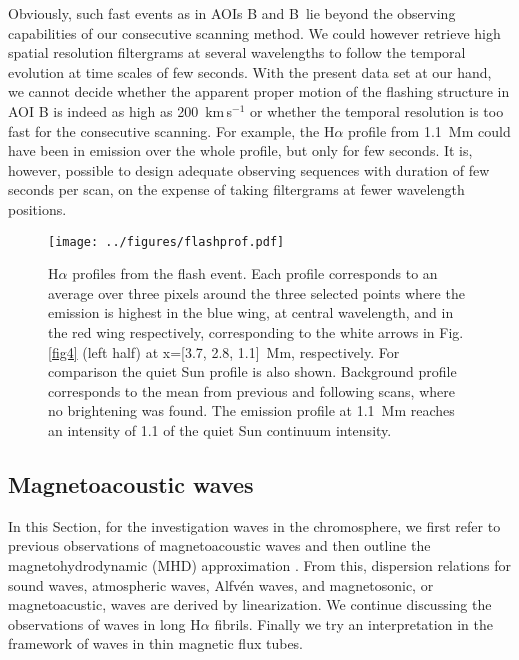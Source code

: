 Obviously, such fast events as in AOIs B and B\arcmin\ lie beyond the observing capabilities of our consecutive scanning method. We could however retrieve high spatial resolution filtergrams at several wavelengths to follow the temporal evolution at time scales of few seconds. With the present data set at our hand, we cannot decide whether the apparent proper motion of the flashing structure in AOI B is indeed as high as 200~km\,s$^{-1}$ or whether the temporal resolution is too fast for the consecutive scanning. For example, the H$\alpha$ profile from 1.1~Mm could have been in emission over the whole profile, but only for few seconds. 
 It is, however, possible to design adequate observing sequences with duration of few seconds per scan, on the expense of taking filtergrams at fewer wavelength positions.
\clearpage




\begin{figure}[t!]
\center 
\texttt{[image: ../figures/flashprof.pdf]} 
\caption{H$\alpha$ profiles from the flash event. Each profile corresponds to an average over three pixels around the three selected points where the emission is highest in the blue wing, at central wavelength, and in the red wing respectively, corresponding to the white arrows in Fig. \ref{fig4} (left half) at x=[3.7, 2.8, 1.1]~Mm, respectively. For comparison the quiet Sun profile is also shown. Background profile corresponds to the mean from previous and following scans, where no brightening  was found. The emission profile at 1.1~Mm reaches an intensity of 1.1 of the quiet Sun continuum intensity.}  
\label{fig5}
\end{figure}

\subsection[Magnetoacoustic waves]{Magnetoacoustic waves\label{waves1}\label{waves2} \label{mhdapprox}}
In this Section, for the investigation waves in the chromosphere, we first refer to previous observations of magnetoacoustic waves and then outline the magnetohydrodynamic (MHD) approximation \citep{ferraro66,kippenhahn75,priest84}. From this, dispersion relations for sound waves, atmospheric waves, Alfv\'en waves, and magnetosonic, or magnetoacustic, waves are derived by linearization. We continue discussing the observations of waves in long H$\alpha$ fibrils. Finally we try an interpretation in the framework of waves in thin magnetic flux tubes.

